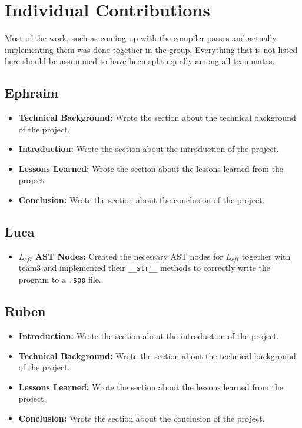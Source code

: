 \section{Individual Contributions}
Most of the work, such as coming up with the compiler passes and actually implementing them was done together in the group. Everything that is not listed here should be assummed
to have been split equally among all teammates.
\subsection{Ephraim}

\begin{itemize}
    \item \textbf{Technical Background:} Wrote the section about the technical background of the project.
    \item \textbf{Introduction:} Wrote the section about the introduction of the project.
    \item \textbf{Lessons Learned:} Wrote the section about the lessons learned from the project.
    \item \textbf{Conclusion:} Wrote the section about the conclusion of the project.
\end{itemize}

\subsection{Luca}

\begin{itemize}
    \item \textbf{$L_{cfi}$ AST Nodes:} Created the necessary AST nodes for $L_{cfi}$ together with team3 and implemented their \texttt{\_\_str\_\_} methods to correctly write the program to a \texttt{.spp} file.
\end{itemize}

\subsection{Ruben}

\begin{itemize}
    \item \textbf{Introduction:} Wrote the section about the introduction of the project.
    \item \textbf{Technical Background:} Wrote the section about the technical background of the project.
    \item \textbf{Lessons Learned:} Wrote the section about the lessons learned from the project.
    \item \textbf{Conclusion:} Wrote the section about the conclusion of the project.
\end{itemize}

